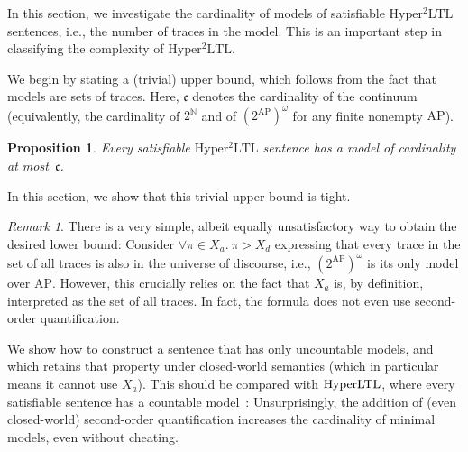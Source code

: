 \documentclass[dvipsnames,10pt,a4paper]{amsart}
\newtheorem{prop}[thm]{Proposition}
\theoremstyle{definition}
\theoremstyle{remark}
\newtheorem{rem}[thm]{Remark}
\newcommand{\nats}{\mathbb{N}}
\newcommand{\pow}[1]{2^{#1}}
\newcommand{\hyltl}{\mathrm{Hyper\-LTL}\xspace}
\newcommand{\sohyltl}{\mathrm{Hyper^2LTL}\xspace}
\newcommand{\ap}[0]{\mathrm{AP}}
\newcommand{\univar}{X_a}
\newcommand{\unidisvar}{X_d}
\newcommand{\contcard}{\mathfrak{c}}
\newcommand{\tracein}{\mathrel{\triangleright}}
\begin{document}
In this section, we investigate the cardinality of models of satisfiable $\sohyltl$ sentences, i.e., the number of traces in the model.
This is an important step in classifying the complexity of $\sohyltl$.

We begin by stating a (trivial) upper bound, which follows from the fact that models are sets of traces.
Here, $\contcard$ denotes the cardinality of the continuum (equivalently, the cardinality of $\pow{\nats}$ and of $(\pow{\ap})^\omega$ for any finite nonempty $\ap$). 

\begin{prop}
    Every satisfiable $\sohyltl$ sentence has a model of cardinality at most~$\contcard$.
\end{prop}

In this section, we show that this trivial upper bound is tight. 

\begin{rem}
\label{remark_unsatisfactory}
There is a very simple, albeit equally unsatisfactory way to obtain the desired lower bound: 
Consider $\forall \pi \in \univar.\ \pi\tracein\unidisvar$ expressing that every trace in the set of all traces is also in the universe of discourse, i.e., $(\pow{\ap})^\omega$ is its only model over $\ap$. 
However, this crucially relies on the fact that $\univar$ is, by definition, interpreted as the set of all traces.
In fact, the formula does not even use second-order quantification.
\end{rem}

We show how to construct a sentence that has only uncountable models, and which retains that property under closed-world semantics (which in particular means it cannot use $\univar$). 
This should be compared with $\hyltl$, where every satisfiable sentence has a countable model~\cite{FZ17}: 
Unsurprisingly, the addition of (even closed-world) second-order quantification increases the cardinality of minimal models, even without cheating.
\end{document}
